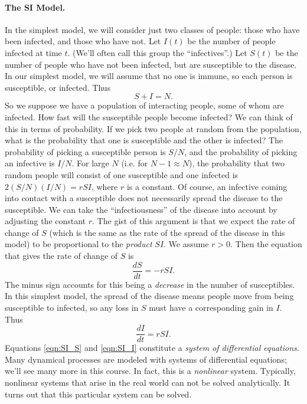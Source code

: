 \documentclass{book}
\begin{document}
\paragraph{The SI Model.}
In the simplest model, we will consider just two classes
of people: those who have been infected, and those who have
not.
Let $I(t)$ be the number of people infected at time $t$.
(We'll often call this group the ``infectives''.)
Let $S(t)$ be the number of people who have not
been infected, but are susceptible to the disease.
In our simplest model, we will assume that no one is immune,
so each person is susceptible, or infected.  Thus
\[
   S+I = N.
\]
So we suppose we have a population of interacting people,
some of whom are infected.  How fast will the susceptible
people become infected?  We can think of this in terms
of probability.  If we pick two people at random from
the population, what is the probability that one is
susceptible and the other is infected? The probability
of picking a susceptible person is $S/N$, and the probability
of picking an infective is $I/N$.  For large $N$ (i.e. for
$N-1\approx N$), the probability that two random
people will consist of one susceptible and one infected
is $2(S/N)(I/N) = rSI$, where $r$ is a constant.
Of course, an infective coming into contact
with a susceptible does not necessarily spread the disease
to the susceptible.
We can take the ``infectiousness'' of the disease into
account by adjusting the constant $r$.
The gist of this argument is that we expect the rate
of change of $S$ (which is the same as the rate of
the spread of the disease in this model) to be proportional
to the \emph{product} $SI$.
We assume $r>0$.  Then the equation that gives the
rate of change of $S$ is
\begin{equation}
  \frac{dS}{dt} = -r S I.
\label{eqn:SI_S}
\end{equation}
The minus sign accounts for this being a \emph{decrease}
in the number of susceptibles.
In this simplest model, the spread of the disease
means people move from being susceptible to
infected, so any loss in $S$ must have a corresponding
gain in $I$.  Thus
\begin{equation}
  \frac{dI}{dt} = r S I.
\label{eqn:SI_I}
\end{equation}
Equations \eqref{eqn:SI_S} and \eqref{eqn:SI_I}
constitute a \emph{system of differential equations}.
Many dynamical processes are modeled with systems of differential
equations; we'll see many more in this course.
In fact, this is a \emph{nonlinear} system.
Typically, nonlinear systems
that arise in the real world can not be solved analytically.
It turns out that this particular system can be solved.
\end{document}
